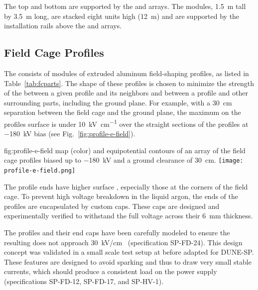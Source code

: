 The top and bottom  %
are supported by the  and  arrays. The  modules, 
\SI{1.5}{\m} tall by \SI{3.5}{\m} long, are stacked eight units high (\SI{12}{\m}) and are supported by the installation rails above the  and  arrays.



\subsection{Field Cage Profiles}
\label{sec:fdsp-hv-des-fc-profiles}

The  consists of modules of extruded aluminum  field-shaping  %
profiles, as listed in Table~\ref{tab:fcparts}. The shape of these %
profiles is chosen to minimize the strength of the \efield{} between a given profile and its neighbors and between a profile and
other surrounding parts, including the ground plane. For example, with a \SI{30}{\cm} separation between the field cage and the ground plane, the maximum \efield{} on the profiles surface is under \SI{10}{\kilo\volt\per\centi\meter} over the straight sections of the profiles at \SI{-180}{\kV} bias (see Fig.~\ref{fig:profile-e-field}).  


\begin{dunefigure}
{fig:profile-e-field}
{\efield{} map (color) and equipotential contours of an array of the field cage profiles biased up to \SI{-180}{\kV} and a ground clearance of \SI{30}{\cm}.} %
\texttt{[image: profile-e-field.png]}
\end{dunefigure}

The profile ends have higher surface \efield{}, especially those at the corners of the field cage. To prevent high voltage breakdown in the liquid argon, the ends of the profiles are encapsulated by custom  caps.  These caps are designed and experimentally verified to withstand the full voltage across their \SI{6}{\milli\m} thickness. 

The profiles and their end caps have been carefully modeled to ensure the resulting \efield{}
 does not approach \SI{30}{\kV}/{cm}~\cite{Blatter:2014wua} (specification SP-FD-24). This design concept was validated in a small scale test setup at  before adapted for DUNE-SP.  
These features are designed to avoid sparking and thus to draw very small stable currents, 
which should produce a consistent load on the power supply (specifications SP-FD-12, SP-FD-17, and SP-HV-1).



